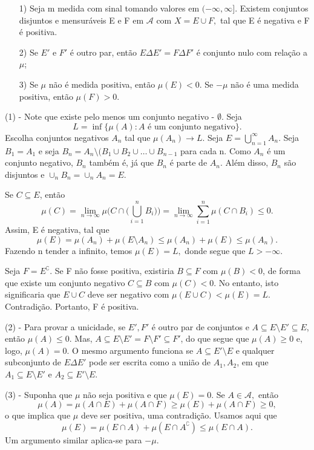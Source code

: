 \documentclass[MeasureTheory/measure_theory.tex]{subfiles}
\begin{document}
\hypertarget{hahn}{
	\begin{theorem*}
		\begin{itemize}
			\item[1)] Seja m medida com sinal tomando valores em \((-\infty, \infty]\). Existem conjuntos disjuntos e mensuráveis E e F em \(\mathcal{A}\) com \(X = E \cup F,\) tal que E é negativa e F é positiva.
			\item[2)] Se \(E'\) e \(F'\) é outro par, então \(E\Delta E' = F\Delta F'\) é conjunto nulo com relação a \(\mu \);
			\item[3)] Se \(\mu \) não é medida positiva, então \(\mu (E) < 0\). Se \(-\mu \) não é uma medida positiva, então \(\mu (F) > 0.\)
		\end{itemize}
	\end{theorem*}}
\begin{proof*}
	(1) - Note que existe pelo menos um conjunto negativo - \(\emptyset \). Seja
	\[
		L = \inf_{}\{\mu (A): A \text{ é um conjunto negativo}\}.
	\]
	Escolha conjuntos negativos \(A_{n}\) tal que \(\mu (A_{n})\to L.\)  Seja \(E = \bigcup_{n=1}^{\infty}A_{n}.\) Seja \(B_1 = A_1\) e seja \(B_{n} = A_{n}\setminus{(B_1\cup B_2\cup \dotsc \cup B_{n-1}}\) para cada n. Como \(A_{n}\) é um conjunto negativo, \(B_{n}\) também é, já que \(B_{n}\) é parte de \(A_{n}\).
	Além disso, \(B_{n}\) são disjuntos e \(\cup _n B_{n} = \cup_{n}^{}A_{n} = E.\)

	Se \(C\subseteq E\), então
	\[
		\mu (C) = \lim_{n\to \infty}\mu \biggl(C\cap \biggl(\bigcup_{i=1}^{n}B_{i}\biggr)\biggr) = \lim_{n\to \infty}\sum\limits_{i=1}^{n}\mu (C\cap B_{i}) \leq 0.
	\]
	Assim, E é negativa, tal que
	\[
		\mu (E) = \mu (A_{n}) + \mu (E\setminus{A_{n}}) \leq \mu (A_{n}) + \mu (E) \leq \mu (A_{n}).
	\]
	Fazendo n tender a infinito, temos \(\mu (E) = L,\) donde segue que \(L> -\infty.\)

	Seja \(F = E ^{\complement}.\) Se F não fosse positiva, existiria \(B\subseteq F\) com \(\mu (B) < 0\), de forma que existe um conjunto negativo \(C\subseteq B\) com \(\mu (C) < 0.\) No entanto, isto significaria que
	\(E\cup C\) deve ser negativo com \(\mu (E\cup C) < \mu (E) = L.\) Contradição. Portanto, F é positiva. \qedsymbol

	(2) - Para provar a unicidade, se \(E', F'\) é outro par de conjuntos e \(A\subseteq E\setminus{E'}\subseteq E\), então \(\mu (A) \leq 0\). Mas, \(A\subseteq E\setminus{E'} = F\setminus{F'}\subseteq F'\), do que segue que \(\mu (A)\geq 0\) e, logo,
	\(\mu (A)=0.\) O mesmo argumento funciona se \(A\subseteq E'\setminus{E}\) e qualquer subconjunto de \(E\Delta E'\) pode ser escrita como a união de \(A_1, A_2\), em que \(A_1\subseteq E\setminus{E'}\) e \(A_2\subseteq E'\setminus{E}.\)

	(3) - Suponha que \(\mu \) não seja positiva e que \(\mu (E) = 0\). Se \(A\in \mathcal{A},\) então
	\[
		\mu (A) = \mu (A\cap E) + \mu (A\cap F) \geq \mu (E) + \mu (A\cap F)\geq 0,
	\]
	o que implica que \(\mu \) deve ser positiva, uma contradição. Usamos aqui que
	\[
		\mu (E) = \mu (E\cap A) + \mu (E\cap A ^{\complement}) \leq \mu (E\cap A).
	\]
	Um argumento similar aplica-se para \(-\mu \). \qedsymbol
\end{proof*}
\end{document}
